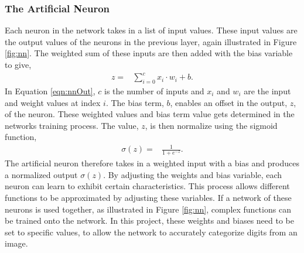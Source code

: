\subsubsection{The Artificial Neuron}
Each neuron in the network takes in a list of input values. These input values are the output values of the neurons in the previous layer, again illustrated in Figure \ref{fig:nn}. The weighted sum of these inputs are then added with the bias variable to give,
\begin{align}
  z =  &\displaystyle{\sum_{i=0}^{c} x_{i}\cdot w_{i} + b}.
\label{eqn:nnOut}
\end{align}
In Equation \ref{eqn:nnOut}, $c$ is the number of inputs and $x_{i}$ and $w_{i}$ are the input and weight values at index $i$. The bias term, $b$, enables an offset in the output, $z$, of the neuron. These weighted values and bias term value gets determined in the networks training process. The value, $z$, is then normalize using the sigmoid function,
\begin{align}
  \sigma(z) =  &\displaystyle{\frac{1}{1 + e^{-z}}}.
\label{eqn:sigmoid}
\end{align}
The artificial neuron therefore takes in a weighted input with a bias and produces a normalized output $\sigma(z)$. By adjusting the weights and bias variable, each neuron can learn to exhibit certain characteristics. This process allows different functions to be approximated by adjusting these variables. If a network of these neurons is used together, as illustrated in Figure \ref{fig:nn}, complex functions can be trained onto the network. In this project, these weights and biases need to be set to specific values, to allow the network to accurately categorize digits from an image.


